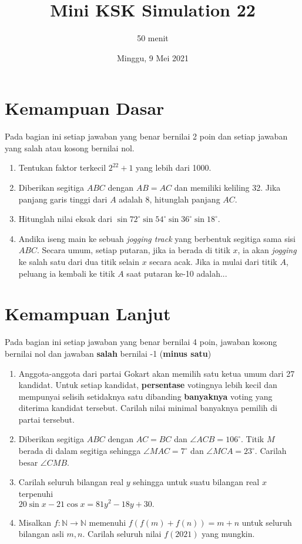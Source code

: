 \documentclass{article}
\title{Mini KSK Simulation 22}
\author{50 menit}
\date{Minggu, 9 Mei 2021}
\begin{document}
	\maketitle
	
	\section{Kemampuan Dasar}
	Pada bagian ini setiap jawaban yang benar bernilai 2 poin dan setiap jawaban yang salah
	atau kosong bernilai nol.
	\begin{enumerate}
		\item Tentukan faktor terkecil $2^{22}+1$ yang lebih dari 1000.
		\item Diberikan segitiga $ABC$ dengan $AB=AC$ dan memiliki keliling 32. Jika panjang garis tinggi dari $A$ adalah 8, hitunglah panjang $AC$.
		\item Hitunglah nilai eksak dari $\sin 72^\circ \sin 54^\circ \sin 36^\circ \sin 18^\circ.$
		\item Andika iseng main ke sebuah \textit{jogging track} yang berbentuk segitiga sama sisi $ABC$. Secara umum, setiap putaran, jika ia berada di titik $x$, ia akan \textit{jogging} ke salah satu dari dua titik selain $x$ secara acak. Jika ia mulai dari titik $A$, peluang ia kembali ke titik $A$ saat putaran ke-10 adalah...
		
		
	\end{enumerate}

\section{Kemampuan Lanjut}
Pada bagian ini setiap jawaban yang benar bernilai 4 poin, jawaban kosong bernilai nol
dan jawaban \textbf{salah} bernilai -1 (\textbf{minus satu})

\begin{enumerate}[resume]
		\item Anggota-anggota dari partai Gokart akan memilih satu ketua umum dari 27 kandidat. Untuk setiap kandidat, \textbf{persentase} votingnya lebih kecil dan mempunyai selisih setidaknya satu  dibanding \textbf{banyaknya} voting yang diterima kandidat tersebut. Carilah nilai minimal banyaknya pemilih di partai tersebut. 
		
		\item Diberikan segitiga $ ABC $ dengan $ AC = BC $ dan $ \angle ACB = 106^\circ. $ Titik $ M $ berada di dalam segitiga sehingga $ \angle MAC = 7^\circ $ dan $ \angle MCA = 23^\circ. $ Carilah besar $ \angle CMB. $
		
		\item Carilah seluruh bilangan real $y$ sehingga untuk suatu bilangan real $x$ terpenuhi\\ $20\sin x-21\cos x=81y^2-18y+30.$
		
		\item Misalkan $f:\mathbb{N}\rightarrow\mathbb{N}$ memenuhi $f(f(m)+f(n))=m+n$ untuk seluruh bilangan asli $m,n$. Carilah seluruh nilai $f(2021)$ yang mungkin.
\end{enumerate}
\end{document}
